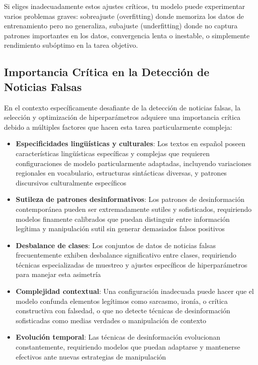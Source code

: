 Si eliges inadecuadamente estos ajustes críticos, tu modelo puede experimentar varios problemas graves: sobreajuste (overfitting) donde memoriza los datos de entrenamiento pero no generaliza, subajuste (underfitting) donde no captura patrones importantes en los datos, convergencia lenta o inestable, o simplemente rendimiento subóptimo en la tarea objetivo.

\subsection{Importancia Crítica en la Detección de Noticias Falsas}

En el contexto específicamente desafiante de la detección de noticias falsas, la selección y optimización de hiperparámetros adquiere una importancia crítica debido a múltiples factores que hacen esta tarea particularmente compleja:

\begin{itemize}
    \item \textbf{Especificidades lingüísticas y culturales}: Los textos en español poseen características lingüísticas específicas y complejas que requieren configuraciones de modelo particularmente adaptadas, incluyendo variaciones regionales en vocabulario, estructuras sintácticas diversas, y patrones discursivos culturalmente específicos
    \item \textbf{Sutileza de patrones desinformativos}: Los patrones de desinformación contemporánea pueden ser extremadamente sutiles y sofisticados, requiriendo modelos finamente calibrados que puedan distinguir entre información legítima y manipulación sutil sin generar demasiados falsos positivos
    \item \textbf{Desbalance de clases}: Los conjuntos de datos de noticias falsas frecuentemente exhiben desbalance significativo entre clases, requiriendo técnicas especializadas de muestreo y ajustes específicos de hiperparámetros para manejar esta asimetría
    \item \textbf{Complejidad contextual}: Una configuración inadecuada puede hacer que el modelo confunda elementos legítimos como sarcasmo, ironía, o crítica constructiva con falsedad, o que no detecte técnicas de desinformación sofisticadas como medias verdades o manipulación de contexto
    \item \textbf{Evolución temporal}: Las técnicas de desinformación evolucionan constantemente, requiriendo modelos que puedan adaptarse y mantenerse efectivos ante nuevas estrategias de manipulación
\end{itemize}

